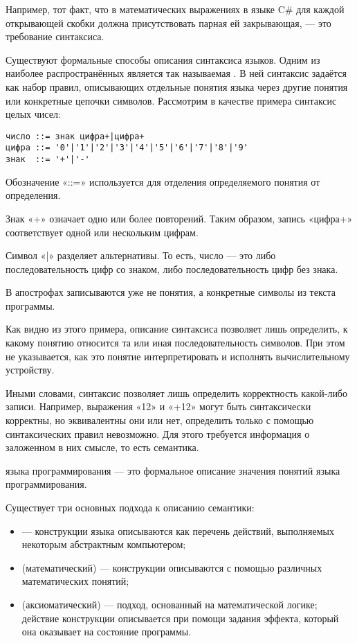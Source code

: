 Например, тот факт, что в математических выражениях в языке C\# для
каждой открывающей скобки должна присутствовать парная ей
закрывающая, — это требование синтаксиса.

Существуют формальные способы описания синтаксиса языков. Одним из
наиболее распространённых является так называемая . В ней синтаксис задаётся как
набор правил, описывающих отдельные понятия языка через другие понятия
или конкретные цепочки символов. Рассмотрим в качестве примера
синтаксис целых чисел:

\begin{verbatim}
число ::= знак цифра+|цифра+
цифра ::= '0'|'1'|'2'|'3'|'4'|'5'|'6'|'7'|'8'|'9'
знак  ::= '+'|'-'
\end{verbatim}

Обозначение «::=» используется для отделения определяемого понятия от
определения.

Знак «+» означает одно или более повторений. Таким образом, запись
«цифра+» соответствует одной или нескольким цифрам.

Символ «|» разделяет альтернативы. То есть, число — это либо
последовательность цифр со знаком, либо последовательность цифр без
знака.

В апострофах записываются уже не понятия, а конкретные символы из
текста программы.

Как видно из этого примера, описание синтаксиса позволяет лишь
определить, к какому понятию относится та или иная последовательность
символов.  При этом не указывается, как это понятие интерпретировать и
исполнять вычислительному устройству.

Иными словами, синтаксис позволяет лишь определить корректность какой-либо
записи. Например, выражения «12» и «+12» могут быть синтаксически
корректны, но эквивалентны они или нет, определить только с помощью
синтаксических правил невозможно. Для этого требуется информация о
заложенном в них смысле, то есть семантика.

\begin{defn}
 языка программирования — это формальное описание
значения понятий языка программирования.
\end{defn}

Существует три основных подхода к описанию семантики:

\begin{itemize}
\item {} — конструкции языка
  описываются как перечень действий, выполняемых некоторым абстрактным
  компьютером;
\item {} (математический) —
  конструкции описываются с помощью различных математических понятий;
\item {} (аксиоматический)
  — подход, основанный на математической логике; действие конструкции
  описывается при помощи задания эффекта, который она оказывает на
  состояние программы.
\end{itemize}

